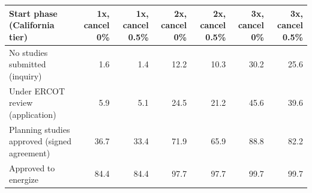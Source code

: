 \begin{tabular}{lrrrrrr}
\toprule
Start phase (California tier) & 1x, cancel 0\% & 1x, cancel 0.5\% & 2x, cancel 0\% & 2x, cancel 0.5\% & 3x, cancel 0\% & 3x, cancel 0.5\% \\
\midrule
No studies submitted (inquiry) & 1.6 & 1.4 & 12.2 & 10.3 & 30.2 & 25.6 \\
Under ERCOT review (application) & 5.9 & 5.1 & 24.5 & 21.2 & 45.6 & 39.6 \\
Planning studies approved (signed agreement) & 36.7 & 33.4 & 71.9 & 65.9 & 88.8 & 82.2 \\
Approved to energize & 84.4 & 84.4 & 97.7 & 97.7 & 99.7 & 99.7 \\
\bottomrule
\end{tabular}